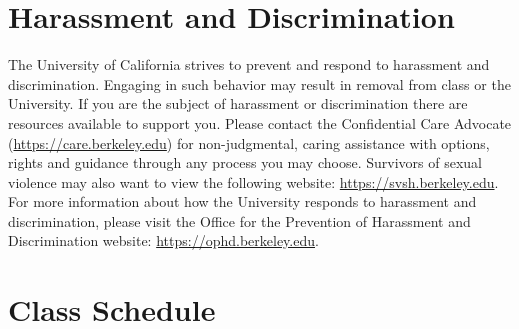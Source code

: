 \documentclass[letterpaper]{inzane_syllabus} %
\begin{document}
\vspace{0.5cm}
\section{Harassment and Discrimination}

The University of California strives to prevent and respond to harassment and discrimination. Engaging in such behavior may result in removal from class or the University. If you are the subject of harassment or discrimination there are resources available to support you. Please contact the Confidential Care Advocate (\url{https://care.berkeley.edu}) for non-judgmental, caring assistance with options, rights and guidance through any process you may choose. Survivors of sexual violence may also want to view the following website: \url{https://svsh.berkeley.edu}.
For more information about how the University responds to harassment and discrimination, please visit the Office for the Prevention of Harassment and Discrimination website: \url{https://ophd.berkeley.edu}.\\

\newpage
\makeFullPage
\section{Class Schedule}
\end{document}
